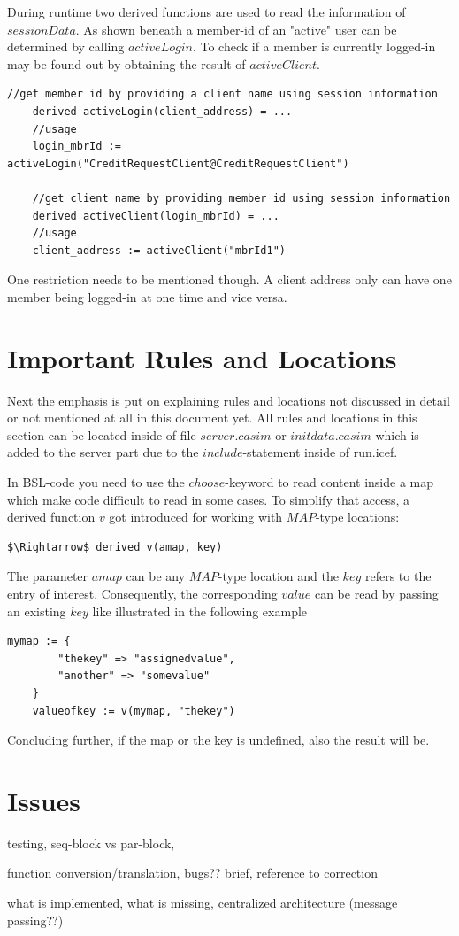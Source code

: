 During runtime two derived functions are used to read the information of $sessionData$. As shown beneath a member-id of an "active" user can be determined by calling $activeLogin$. To check if a member is currently logged-in may be found out by obtaining the result of $activeClient$.

\begin{lstlisting}[language=bsl]
	//get member id by providing a client name using session information
	derived activeLogin(client_address) = ...
	//usage
	login_mbrId := activeLogin("CreditRequestClient@CreditRequestClient")
	
	//get client name by providing member id using session information
	derived activeClient(login_mbrId) = ...
	//usage
	client_address := activeClient("mbrId1")
\end{lstlisting}

One restriction needs to be mentioned though. A client address only can have one member being logged-in at one time and vice versa.

\section{Important Rules and Locations}
\label{sec:impl-rules}

Next the emphasis is put on explaining rules and locations not discussed in detail or not mentioned at all in this document yet. All rules and locations in this section can be located inside of file $server.casim$ or $initdata.casim$ which is added to the server part due to the $include$-statement inside of run.icef.

In BSL-code you need to use the $choose$-keyword to read content inside a map which make code difficult to read in some cases. To simplify that access, a derived function $v$ got introduced for working with $MAP$-type locations:

\begin{lstlisting}[language=bsl,mathescape=true]
	$\Rightarrow$ derived v(amap, key)
\end{lstlisting}

The parameter $amap$ can be any $MAP$-type location and the $key$ refers to the entry of interest. Consequently, the corresponding $value$ can be read by passing an existing $key$ like illustrated in the following example

\begin{lstlisting}[language=bsl,mathescape=true]
	mymap := {
		"thekey" => "assignedvalue",
		"another" => "somevalue"		
	}
	valueofkey := v(mymap, "thekey")
\end{lstlisting}

Concluding further, if the map or the key is undefined, also the result will be.

\section{Issues}
\label{sec:impl-issues}

testing, seq-block vs par-block, 

function conversion/translation, bugs?? brief, reference to correction

what is implemented, what is missing, centralized architecture (message passing??)